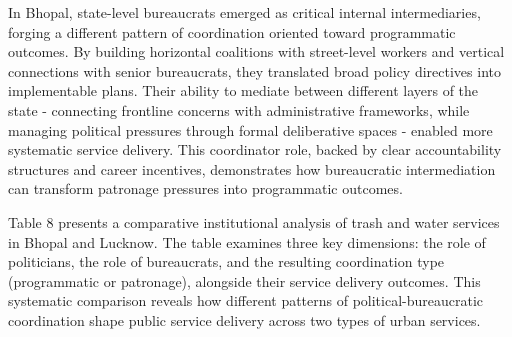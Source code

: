 In Bhopal, state-level bureaucrats emerged as critical internal intermediaries, forging a different pattern of coordination oriented toward programmatic outcomes. By building horizontal coalitions with street-level workers and vertical connections with senior bureaucrats, they translated broad policy directives into implementable plans. Their ability to mediate between different layers of the state - connecting frontline concerns with administrative frameworks, while managing political pressures through formal deliberative spaces - enabled more systematic service delivery. This coordinator role, backed by clear accountability structures and career incentives, demonstrates how bureaucratic intermediation can transform patronage pressures into programmatic outcomes.

Table 8 presents a comparative institutional analysis of trash and water services in Bhopal and Lucknow. The table examines three key dimensions: the role of politicians, the role of bureaucrats, and the resulting coordination type (programmatic or patronage), alongside their service delivery outcomes. This systematic comparison reveals how different patterns of political-bureaucratic coordination shape public service delivery across two types of urban services.

